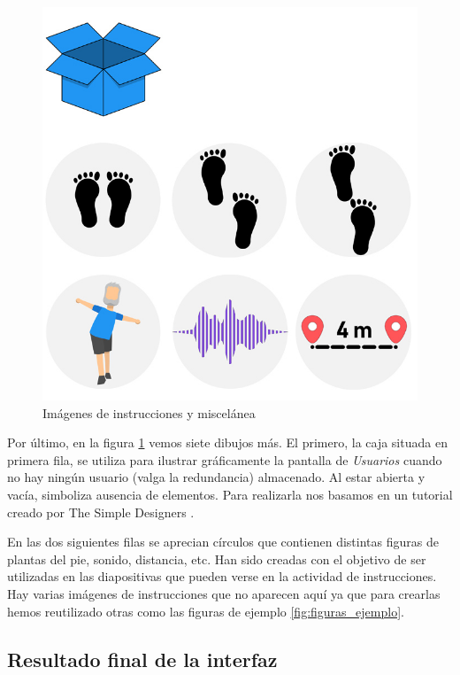 \begin{figure}[H]
	\centering
	\includegraphics[scale=0.45]{imagenes/slides.jpg}
	\caption{Imágenes de instrucciones y miscelánea\label{fig:instrucciones}}
\end{figure}

Por último, en la figura \ref{fig:instrucciones} vemos siete dibujos más. El primero, la caja situada en primera fila, se utiliza para ilustrar gráficamente la pantalla de \textit{Usuarios} cuando no hay ningún usuario (valga la redundancia) almacenado. Al estar abierta y vacía, simboliza ausencia de elementos. Para realizarla nos basamos en un tutorial creado por The Simple Designers \cite{SimpleDesigners}.

En las dos siguientes filas se aprecian círculos que contienen distintas figuras de plantas del pie, sonido, distancia, etc. Han sido creadas con el objetivo de ser utilizadas en las diapositivas que pueden verse en la actividad de instrucciones. Hay varias imágenes de instrucciones que no aparecen aquí ya que para crearlas hemos reutilizado otras como las figuras de ejemplo \ref{fig:figuras_ejemplo}.

\subsection{Resultado final de la interfaz}

